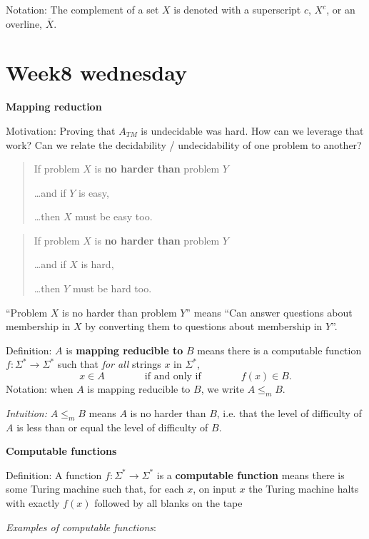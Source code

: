 \documentclass[12pt, oneside]{article}
\begin{document}
Notation: The complement  of a set $X$ is denoted with  a superscript $c$, $X^c$, or an overline,  $\overline{X}$.
 \vfill
\section*{Week8 wednesday}


{\bf Mapping reduction}

Motivation: Proving that $A_{TM}$ is undecidable was hard. How can we leverage that work? 
Can we relate the decidability / undecidability of one problem to another?

\begin{quote}
If problem $X$ is {\bf no harder than} problem $Y$

\ldots and if $Y$ is easy,

\ldots then $X$ must be easy too.
\end{quote}


\begin{quote}
    If problem $X$ is {\bf no harder than} problem $Y$
    
    \ldots and if $X$ is hard,
    
    \ldots then $Y$ must be hard too.
\end{quote}

``Problem $X$ is no harder than problem $Y$'' means 
``Can answer questions about membership in $X$ by converting them to questions about membership in $Y$''.



Definition:  $A$ is  {\bf  mapping  reducible to} $B$  means there is a computable function 
$f : \Sigma^* \to \Sigma^*$ such that {\it for all} strings  $x$ in $\Sigma^*$, 
\[
x  \in  A \qquad \qquad \text{if and  only  if} \qquad \qquad f(x) \in B.
\]
Notation:  when $A$  is mapping reducible to $B$, we write $A  \leq_m B$.

{\it Intuition:} $A \leq_m B$ means $A$ is no harder than $B$, i.e. that the level 
of difficulty of $A$ is less than or equal the level of difficulty of $B$.

\vfill

\newpage
{\bf Computable functions}

Definition: A function $f: \Sigma^* \to \Sigma^*$ is a {\bf computable function} means there is some Turing machine such that, 
for each $x$, on input $x$ the Turing machine halts with exactly $f(x)$ followed by all blanks on the tape

{\it Examples of computable functions}:
\end{document}
